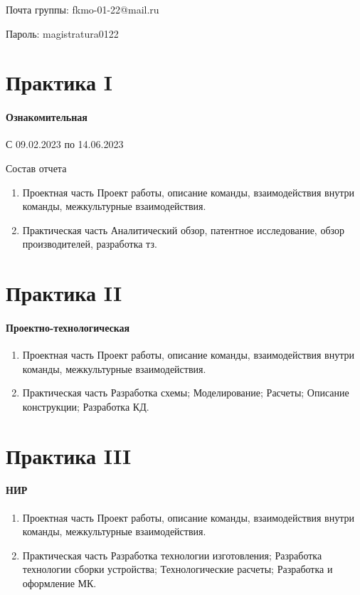 Почта группы: fkmo-01-22@mail.ru


Пароль: magistratura0122

\section{Практика I}
\paragraph{Ознакомительная}
С 09.02.2023 по 14.06.2023

Состав отчета
\begin{enumerate}
    \item Проектная часть
    Проект работы, описание команды, взаимодействия внутри команды, межкультурные взаимодействия.
    \item Практическая часть
    Аналитический обзор, патентное исследование, обзор производителей, разработка тз.
\end{enumerate}

\section{Практика II}
\paragraph{Проектно-технологическая}
\begin{enumerate}
    \item Проектная часть
    Проект работы, описание команды, взаимодействия внутри команды, межкультурные взаимодействия.
    \item Практическая часть
    Разработка схемы; Моделирование; Расчеты; Описание конструкции; Разработка КД.
\end{enumerate}

\section{Практика III}

\paragraph{НИР}

\begin{enumerate}
    \item Проектная часть
    Проект работы, описание команды, взаимодействия внутри команды, межкультурные взаимодействия.
    \item Практическая часть
    Разработка технологии изготовления; Разработка технологии сборки устройства; Технологические расчеты; Разработка и оформление МК.
\end{enumerate}



